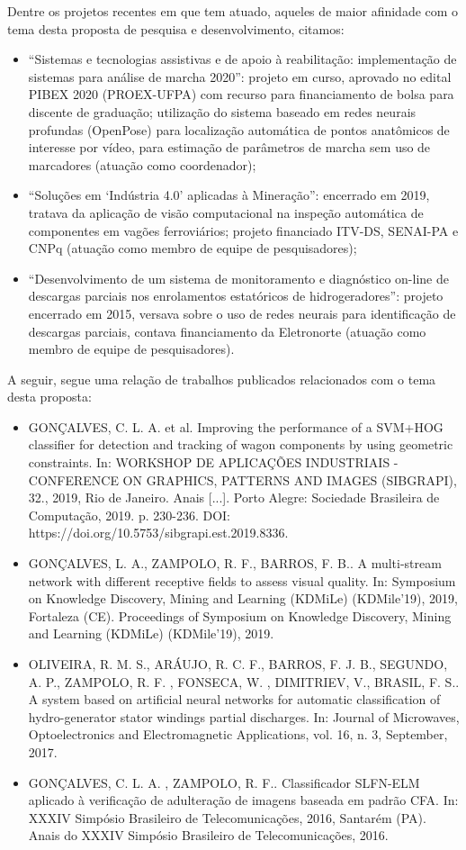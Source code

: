 \begin{enumerate}
Dentre os projetos recentes em que tem atuado, aqueles de maior afinidade com o tema desta proposta de pesquisa e desenvolvimento, citamos: 
		\begin{itemize}
			\item ``Sistemas e tecnologias assistivas e de apoio à reabilitação: implementação de sistemas para análise de marcha 2020'': projeto em curso, aprovado no edital PIBEX 2020 (PROEX-UFPA) com recurso para financiamento de bolsa para discente de graduação; utilização do sistema baseado em redes neurais profundas (OpenPose) para localização automática de pontos anatômicos de interesse por vídeo, para estimação de parâmetros de marcha sem uso de marcadores (atuação como coordenador); 
			\item ``Soluções em `Indústria 4.0' aplicadas à Mineração'': encerrado em 2019, tratava da aplicação de visão computacional na inspeção automática de componentes em vagões ferroviários; projeto financiado ITV-DS, SENAI-PA e CNPq (atuação como membro de equipe de pesquisadores);
			\item ``Desenvolvimento de um sistema de monitoramento e diagnóstico on-line de descargas parciais nos enrolamentos estatóricos de hidrogeradores'': projeto encerrado em 2015, versava sobre o uso de redes neurais para identificação de descargas parciais, contava financiamento da Eletronorte (atuação como membro de equipe de pesquisadores).
		\end{itemize}
A seguir, segue uma relação de trabalhos publicados relacionados com o tema desta proposta:
		\begin{itemize}
			\item GONÇALVES, C. L. A. et al. Improving the performance of a SVM+HOG classifier for detection and tracking of wagon components by using geometric constraints. In: WORKSHOP DE APLICAÇÕES INDUSTRIAIS - CONFERENCE ON GRAPHICS, PATTERNS AND IMAGES (SIBGRAPI), 32., 2019, Rio de Janeiro. Anais [...]. Porto Alegre: Sociedade Brasileira de Computação, 2019. p. 230-236. DOI: https://doi.org/10.5753/sibgrapi.est.2019.8336. 
			\item GONÇALVES, L. A., ZAMPOLO, R. F., BARROS, F. B.. A multi-stream network with different receptive fields to assess visual quality. In: Symposium on Knowledge Discovery, Mining and Learning (KDMiLe) (KDMile'19), 2019, Fortaleza (CE). Proceedings of Symposium on Knowledge Discovery, Mining and Learning (KDMiLe) (KDMile'19), 2019. 
			\item OLIVEIRA, R. M. S., ARÁUJO, R. C. F., BARROS, F. J. B., SEGUNDO, A. P., ZAMPOLO, R. F. , FONSECA, W. , DIMITRIEV, V., BRASIL, F. S.. A system based on artificial neural networks for automatic classification of hydro-generator stator windings partial discharges. In: Journal of Microwaves, Optoelectronics and Electromagnetic Applications, vol. 16, n. 3, September, 2017.
			\item GONÇALVES, C. L. A. , ZAMPOLO, R. F.. Classificador SLFN-ELM aplicado à verificação de adulteração de imagens baseada em padrão CFA. In: XXXIV Simpósio Brasileiro de Telecomunicações, 2016, Santarém (PA). Anais do XXXIV Simpósio Brasileiro de Telecomunicações, 2016.
		\end{itemize}	


\end{enumerate}
